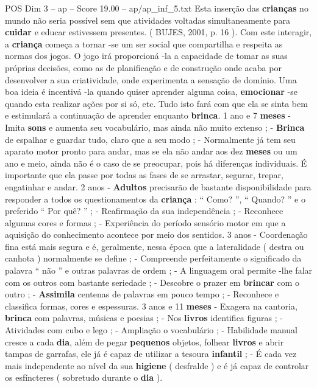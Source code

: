 \begin{textsample}{POS Dim 3 – ap – Score 19.00 – ap/ap\_inf\_5.txt}
Esta inserção das \textbf{crianças} no mundo não seria possível sem que atividades voltadas simultaneamente para \textbf{cuidar} e educar estivessem presentes. ( BUJES, 2001, p. 16 ).
Com este interagir, a \textbf{criança} começa a tornar -se um ser social que compartilha e respeita as normas dos jogos.
O jogo irá proporcioná -la a capacidade de tomar as suas próprias decisões, como as de planificação e de construção onde acaba por desenvolver a sua criatividade, onde experimenta a sensação de domínio.
Uma boa ideia é incentivá -la quando quiser aprender alguma coisa, \textbf{emocionar} -se quando esta realizar ações por si só, etc.
Tudo isto fará com que ela se sinta bem e estimulará a continuação de aprender enquanto \textbf{brinca}. 1 ano e 7 \textbf{meses} - Imita \textbf{sons} e aumenta seu vocabulário, mas ainda não muito extenso ; - \textbf{Brinca} de espalhar e guardar tudo, claro que a seu modo ; - Normalmente já tem seu aparato motor pronto para andar, mas se ela não andar aos dez \textbf{meses} ou um ano e meio, ainda não é o caso de se preocupar, pois há diferenças individuais.
É importante que ela passe por todas as fases de se arrastar, segurar, trepar, engatinhar e andar. 2 anos - \textbf{Adultos} precisarão de bastante disponibilidade para responder a todos os questionamentos da \textbf{criança} : “ Como? ”, “ Quando? ” e o preferido “ Por quê? ” ; - Reafirmação da sua independência ; - Reconhece algumas cores e formas ; - Experiência do período sensório motor em que a aquisição do conhecimento acontece por meio dos sentidos. 3 anos - Coordenação fina está mais segura e é, geralmente, nessa época que a lateralidade ( destra ou canhota ) normalmente se define ; - Compreende perfeitamente o significado da palavra “ não ” e outras palavras de ordem ; - A linguagem oral permite -lhe falar com os outros com bastante seriedade ; - Descobre o prazer em \textbf{brincar} com o outro ; - \textbf{Assimila} centenas de palavras em pouco tempo ; - Reconhece e classifica formas, cores e espessuras. 3 anos e 11 \textbf{meses} - Exagera na cantoria, \textbf{brinca} com palavras, músicas e poesias ; - Nos \textbf{livros} identifica figuras ; - Atividades com cubo e lego ; - Ampliação o vocabulário ; - Habilidade manual cresce a cada \textbf{dia}, além de pegar \textbf{pequenos} objetos, folhear \textbf{livros} e abrir tampas de garrafas, ele já é capaz de utilizar a tesoura \textbf{infantil} ; - É cada vez mais independente ao nível da sua \textbf{higiene} ( desfralde ) e é já capaz de controlar os esfíncteres ( sobretudo durante o \textbf{dia} ).

\end{textsample}

